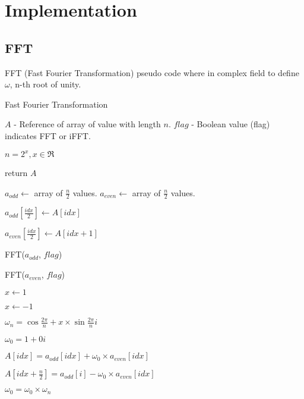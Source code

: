 \documentclass[12pt]{article}
\begin{document}
	\section{Implementation}
		\subsection{FFT}
			FFT (Fast Fourier Transformation) pseudo code where in complex field to define $\omega$, n-th root of unity.
			
			\begin{algorithm}[H]
				\caption{Fast Fourier Transformation} \label{alg:cap}
				\begin{algorithmic}
					\Require $A$ - Reference of array of value with length $n$. $flag$ - Boolean value (flag) indicates FFT or iFFT.
					
					\Ensure $n = 2^{x}, x \in \Re$
					
					
						
						return $A$
					\EndIf
					
					\State $a_{odd} \gets$ array of $\frac{n}{2}$ values.
					\State $a_{even} \gets$ array of $\frac{n}{2}$ values.
					
					
						$a_{odd}[\frac{idx}{2}] \gets A[idx]$
						
						$a_{even}[\frac{idx}{2}] \gets A[idx + 1]$
					\EndFor
					
					FFT($a_{odd}$, $flag$)
					
					FFT($a_{even}$, $flag$)
					
					
					\State $x \gets 1$
					\Else 
					
					\State $x \gets -1$
					\EndIf
					
					\State $\omega_{n} = \cos \frac{2\pi}{n} + x \times \sin \frac{2\pi}{n}i$
					
					\State $\omega_{0} = 1 + 0i$
					
						
						$A[idx] = a_{odd}[idx] + \omega_{0} \times a_{even}[idx] $
						
						$A[idx + \frac{n}{2}] = a_{odd}[i] - \omega_{0} \times a_{even}[idx]$
						
						$\omega_{0} = \omega_{0} \times \omega_{n}$
					\EndFor
					\EndProcedure
					
					
				\end{algorithmic}
			\end{algorithm}
\end{document}
